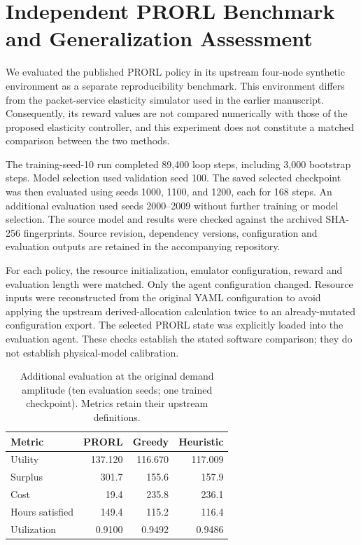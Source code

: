 \section{Independent PRORL Benchmark and Generalization Assessment}
\label{sec:prorl-benchmark}
We evaluated the published PRORL policy in its upstream four-node synthetic
environment as a separate reproducibility benchmark. This environment differs
from the packet-service elasticity simulator used in the earlier manuscript.
Consequently, its reward values are not compared numerically with those of the
proposed elasticity controller, and this experiment does not constitute a
matched comparison between the two methods.

The training-seed-10 run completed 89,400 loop steps, including 3,000 bootstrap
steps. Model selection used validation seed 100. The saved selected checkpoint
was then evaluated using seeds 1000, 1100, and 1200, each for 168 steps. An
additional evaluation used seeds 2000--2009 without further training or model
selection. The source model and results were checked against the archived
SHA-256 fingerprints. Source revision, dependency versions, configuration and
evaluation outputs are retained in the accompanying repository.

For each policy, the resource initialization, emulator configuration, reward
and evaluation length were matched. Only the agent configuration changed.
Resource inputs were reconstructed from the original YAML configuration to
avoid applying the upstream derived-allocation calculation twice to an
already-mutated configuration export. The selected PRORL state was explicitly
loaded into the evaluation agent. These checks establish the stated software
comparison; they do not establish physical-model calibration.

\begin{table}[t]
\centering
\caption{Additional evaluation at the original demand amplitude (ten evaluation
seeds; one trained checkpoint). Metrics retain their upstream definitions.}
\label{tab:prorl-original}
\begin{tabular}{lrrr}
\hline
Metric & PRORL & Greedy & Heuristic\\
\hline
Utility & 137.120 & 116.670 & 117.009\\
Surplus & 301.7 & 155.6 & 157.9\\
Cost & 19.4 & 235.8 & 236.1\\
Hours satisfied & 149.4 & 115.2 & 116.4\\
Utilization & 0.9100 & 0.9492 & 0.9486\\
\hline
\end{tabular}
\end{table}

